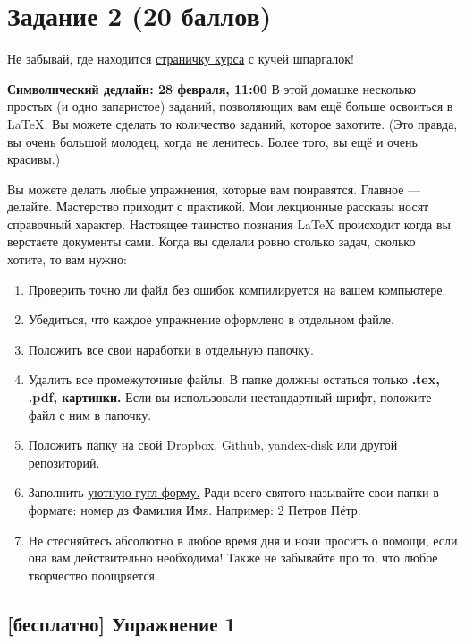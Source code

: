 \documentclass[12pt, a4paper, oneside]{article}
\begin{document}
\section*{Задание 2  (20 баллов)}

Не забывай, где находится  \href{https://fulyankin.github.io/LaTeX/}{страничку курса} с кучей шпаргалок!

\textbf{Символический дедлайн:  28 февраля, 11:00} В этой домашке несколько простых  (и одно запаристое) заданий, позволяющих вам ещё больше освоиться в \LaTeX{.}  Вы можете сделать то количество заданий, которое захотите. (Это правда, вы очень большой молодец, когда не ленитесь. Более того, вы ещё и очень красивы.) 

Вы можете делать любые упражнения, которые вам понравятся. Главное --- делайте. Мастерство приходит с практикой. Мои лекционные рассказы носят справочный характер. Настоящее таинство познания \LaTeX{} происходит когда вы верстаете документы сами. Когда вы сделали ровно столько задач, сколько хотите, то вам нужно:

\begin{enumerate}
\item Проверить точно ли файл без ошибок компилируется на вашем компьютере.
\item Убедиться, что каждое упражнение оформлено в отдельном файле.
\item Положить все свои наработки в отдельную папочку.
\item Удалить все промежуточные файлы. В папке должны остаться только \textbf{.tex, .pdf, картинки.} Если вы использовали нестандартный шрифт, положите файл с ним в папочку.
\item Положить папку на	свой	Dropbox, Github,	yandex-disk	или другой	репозиторий.
\item Заполнить	\href{https://docs.google.com/forms/d/e/1FAIpQLSe11kxKVfv07iCL1E9yNX7ll9swKImiVwRr1H70lslGzInRSg/viewform}{уютную гугл-форму.} Ради всего святого называйте свои папки в формате: номер дз Фамилия Имя. Например: 2 Петров Пётр.
\item Не стесняйтесь абсолютно в любое время дня и ночи просить о помощи, если она вам действительно необходима! Также не забывайте про то, что любое творчество поощряется. 
\end{enumerate}

\subsection*{[бесплатно]  Упражнение 1 }
\end{document}
